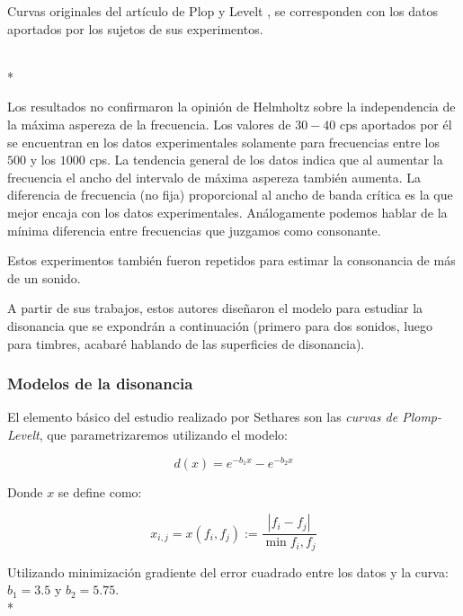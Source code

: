 \documentclass[11pt,a4paper]{article}
\begin{document}
    \begin{center}Curvas originales del artículo de Plop y Levelt \cite{PL}, se corresponden con los datos aportados por los sujetos de sus experimentos. \end{center}\\*
	
	Los resultados no confirmaron la opinión de Helmholtz sobre la independencia de la máxima aspereza de la frecuencia. Los valores de $30-40$ cps aportados por él se encuentran en los datos experimentales solamente para frecuencias entre los $500$ y los $1000$ cps. La tendencia general de los datos indica que al aumentar la frecuencia el ancho del intervalo de máxima aspereza también aumenta. La diferencia de frecuencia (no fija) proporcional al ancho de banda crítica es la que mejor encaja con los datos experimentales.
	Análogamente podemos hablar de la mínima diferencia entre frecuencias que juzgamos como consonante.
	
	Estos experimentos también fueron repetidos para estimar la consonancia de más de un sonido.
	
	A partir de sus trabajos, estos autores diseñaron el modelo para estudiar la disonancia que se expondrán a continuación (primero para dos sonidos, luego para timbres, acabaré hablando de las superficies de disonancia).
	
	\subsubsection{Modelos de la disonancia}
	
		
	El elemento básico del estudio realizado por Sethares son las \emph{curvas de Plomp-Levelt}, que parametrizaremos utilizando el modelo:

    $$ d(x) = e^{-b_1 x} -  e^{-b_2 x} $$

    Donde $x$ se define como:
    
    $$
        x_{i,j} = x (f_i, f_j) := \frac{| f_i - f_j |}{\min{f_i, f_j}}
    $$
    
    Utilizando minimización gradiente del error cuadrado entre los datos y la curva: $b_1 = 3.5$ y $b_2 = 5.75$. \\*

    
\end{document}
